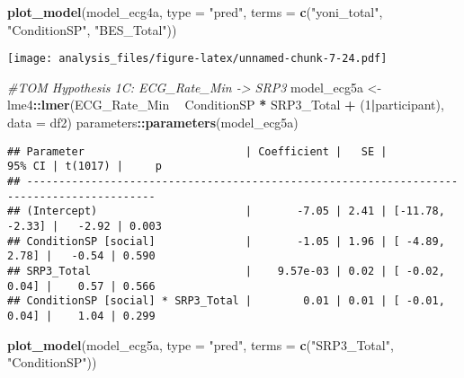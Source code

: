 \documentclass[
]{article}
\newenvironment{Shaded}{\begin{snugshade}}{\end{snugshade}}
\newcommand{\CommentTok}[1]{\textcolor[rgb]{0.56,0.35,0.01}{\textit{#1}}}
\newcommand{\DataTypeTok}[1]{\textcolor[rgb]{0.13,0.29,0.53}{#1}}
\newcommand{\DecValTok}[1]{\textcolor[rgb]{0.00,0.00,0.81}{#1}}
\newcommand{\KeywordTok}[1]{\textcolor[rgb]{0.13,0.29,0.53}{\textbf{#1}}}
\newcommand{\NormalTok}[1]{#1}
\newcommand{\OperatorTok}[1]{\textcolor[rgb]{0.81,0.36,0.00}{\textbf{#1}}}
\newcommand{\StringTok}[1]{\textcolor[rgb]{0.31,0.60,0.02}{#1}}
\begin{document}
\begin{Shaded}
\begin{Highlighting}[]
\KeywordTok{plot_model}\NormalTok{(model_ecg4a, }\DataTypeTok{type =} \StringTok{"pred"}\NormalTok{, }\DataTypeTok{terms =} \KeywordTok{c}\NormalTok{(}\StringTok{"yoni_total"}\NormalTok{, }\StringTok{"ConditionSP"}\NormalTok{, }\StringTok{"BES_Total"}\NormalTok{))}
\end{Highlighting}
\end{Shaded}

\texttt{[image: analysis\_files/figure-latex/unnamed-chunk-7-24.pdf]}

\begin{Shaded}
\begin{Highlighting}[]
\CommentTok{#TOM Hypothesis 1C: ECG_Rate_Min -> SRP3}
\NormalTok{model_ecg5a <-}\StringTok{ }\NormalTok{lme4}\OperatorTok{::}\KeywordTok{lmer}\NormalTok{(ECG_Rate_Min }\OperatorTok{~}\StringTok{ }\NormalTok{ConditionSP }\OperatorTok{*}\StringTok{ }\NormalTok{SRP3_Total }\OperatorTok{+}\StringTok{ }\NormalTok{(}\DecValTok{1}\OperatorTok{|}\NormalTok{participant), }\DataTypeTok{data =}\NormalTok{ df2)}
\NormalTok{parameters}\OperatorTok{::}\KeywordTok{parameters}\NormalTok{(model_ecg5a)}
\end{Highlighting}
\end{Shaded}

\begin{verbatim}
## Parameter                         | Coefficient |   SE |          95% CI | t(1017) |     p
## ------------------------------------------------------------------------------------------
## (Intercept)                       |       -7.05 | 2.41 | [-11.78, -2.33] |   -2.92 | 0.003
## ConditionSP [social]              |       -1.05 | 1.96 | [ -4.89,  2.78] |   -0.54 | 0.590
## SRP3_Total                        |    9.57e-03 | 0.02 | [ -0.02,  0.04] |    0.57 | 0.566
## ConditionSP [social] * SRP3_Total |        0.01 | 0.01 | [ -0.01,  0.04] |    1.04 | 0.299
\end{verbatim}

\begin{Shaded}
\begin{Highlighting}[]
\KeywordTok{plot_model}\NormalTok{(model_ecg5a, }\DataTypeTok{type =} \StringTok{"pred"}\NormalTok{, }\DataTypeTok{terms =} \KeywordTok{c}\NormalTok{(}\StringTok{"SRP3_Total"}\NormalTok{, }\StringTok{"ConditionSP"}\NormalTok{))}
\end{Highlighting}
\end{Shaded}
\end{document}
